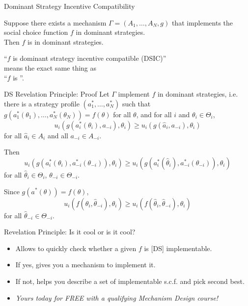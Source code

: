 \documentclass[english,10pt
,aspectratio=169
]{beamer}
\begin{document}
\begin{frame}{Dominant Strategy Incentive Compatibility}
	\begin{theorem}
		Suppose there exists a mechanism $\Gamma=(A_{1},\dots,A_{N},g)$ that implements the social choice function $f$ in dominant strategies.\\ Then $f$ is  in dominant strategies.
	\end{theorem}
	\medskip
	\begin{definition}
		``$f$ is \alert{dominant strategy incentive compatible} (DSIC)''\\ 
		means the exact same thing as \\
		``$f$ is ''.
	\end{definition}
\end{frame}


\begin{frame}{DS Revelation Principle: Proof}
	Let $\Gamma$ implement $f$ in dominant strategies, i.e. there is a strategy profile  $(a_1^*,\dots,a_N^*)$ such that $g(a_1^*(\theta_{1}),\dots,a_N^*(\theta_{N}))=f(\theta)$ for all $\theta$, and for all $i$ and  $\theta_{i}\in\Theta_{i}$,
	$$ u_{i}(g(a_{i}^{*}(\theta_{i}),a_{-i}),\theta_{i})\geq u_{i}(g(\hat a_{i},a_{-i}),\theta_{i})$$
	for all $\hat a_{i}\in A_{i}$ and all $a_{-i}\in A_{-i}$. 
	
	Then
	$$ u_{i}(g(a_{i}^{*}(\theta_{i}), a_{-i}^{*}(\theta_{-i})),\theta_{i})\geq u_i (g(a^*_i(\hat{\theta}_i), a_{-i}^{*}(\theta_{-i})), \theta_i)$$
	for all $\hat{\theta}_i \in \Theta_i$, $\theta_{-i} \in \Theta_{-i}$. 
	
	Since $g(a^*(\theta)) = f(\theta)$,
	$$ u_i (f(\theta_i,\hat{\theta}_{-i}),\theta_i) \geq u_i (f(\hat{\theta}_i,\hat{\theta}_{-i}), \theta_i)$$
	for all $\hat{\theta}_{-i} \in \Theta_{-i}$.
\end{frame}


\begin{frame}{Revelation Principle: Is it cool or is it cool?}
	\begin{itemize}
		\item Allows to quickly check whether a given $f$ is [DS] implementable.
		\item If yes, gives you a mechanism to implement it.
		\item If not, helps you describe a set of implementable s.c.f. and pick second best.
		\item \emph{Yours today for  FREE with a qualifying Mechanism Design course!}
	\end{itemize}
\end{frame}
\end{document}
